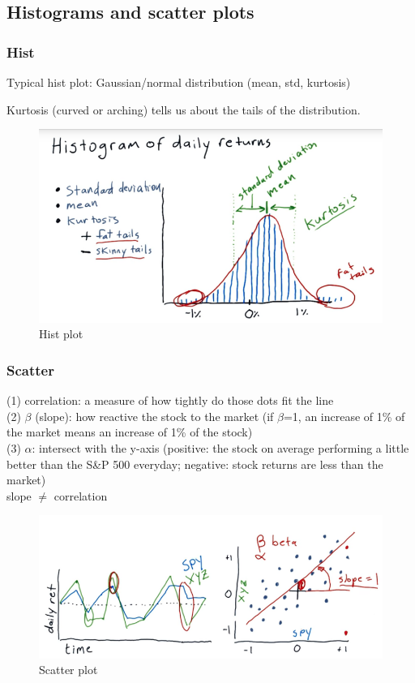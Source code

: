 \documentclass[12pt]{article}
\begin{document}
\subsection{Histograms and scatter plots}

\subsubsection{Hist} 

Typical hist plot: Gaussian/normal distribution (mean, std, kurtosis)

Kurtosis (curved or arching) tells us about the tails of the distribution.

\begin{figure}[!ht]
\centering
\includegraphics[scale=0.45]{fig/fig16}
\caption{Hist plot}
\end{figure}

\subsubsection{Scatter} 
\noindent
(1) correlation: a measure of how tightly do those dots fit the line \\
(2) $\beta$ (slope): how reactive the stock to the market (if $\beta$=1, an increase of 1\% of the market means an increase of 1\% of the stock) \\
(3) $\alpha$: intersect with the y-axis (positive: the stock on average performing a little better than the S\&P 500 everyday; negative: stock returns are less than the market) \\
slope $\neq$ correlation\\

\begin{figure}[!ht]
\centering
\includegraphics[scale=0.45]{fig/fig17}
\caption{Scatter plot}
\end{figure}
\end{document}
